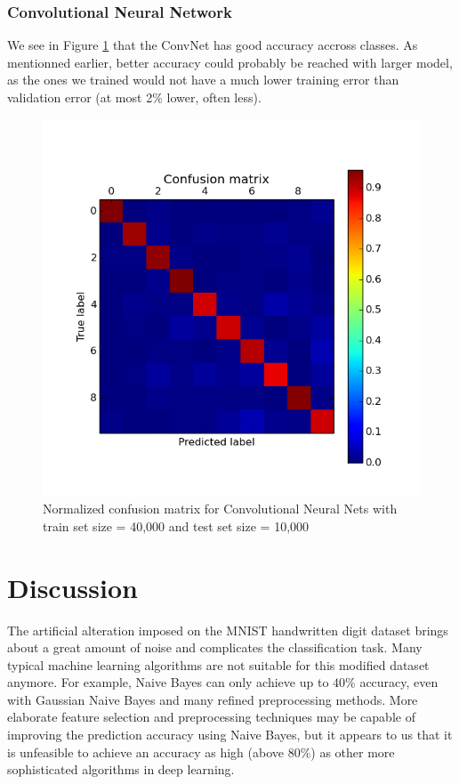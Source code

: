 \documentclass{acm_proc_article-sp}
\begin{document}
\subsubsection{Convolutional Neural Network}
We see in Figure \ref{fig:conv_conf} that the ConvNet has good accuracy accross classes. As mentionned earlier, better accuracy could probably be reached with larger model, as the ones we trained would not have a much lower training error than validation error (at most 2$\%$ lower, often less).
\begin{figure} 
\centering
\includegraphics[width=0.9\columnwidth]{graphs/conv_conf.png}  
\caption{Normalized confusion matrix for Convolutional Neural Nets with train set size = 40,000 and test set size = 10,000}
\label{fig:conv_conf}
\end{figure}


\section{Discussion}
The artificial alteration imposed on the MNIST handwritten digit dataset brings about a great amount of noise and complicates the classification task. Many typical machine learning algorithms are not suitable for this modified dataset anymore. For example, Naive Bayes can only achieve up to  $40 \%$ accuracy, even with Gaussian Naive Bayes and many refined preprocessing methods.  More elaborate feature selection and preprocessing techniques may be capable of improving the prediction accuracy using Naive Bayes, but it appears to us that it is unfeasible to achieve an accuracy as high (above $80 \%$) as other more sophisticated algorithms in deep learning.
\end{document}
